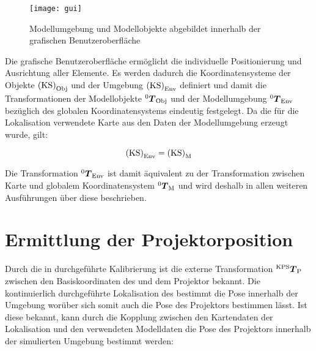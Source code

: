 \begin{figure}[!ht]
	\begin{center}
		\texttt{[image: gui]}
		\caption{Modellumgebung und Modellobjekte abgebildet innerhalb der grafischen Benutzeroberfläche}
		\label{fig.modscene}
	\end{center}
\end{figure}

\prever{
}

Die grafische Benutzeroberfläche ermöglicht die individuelle Positionierung und Ausrichtung aller Elemente. Es werden dadurch die Koordinatensysteme der Objekte ${\mathrm{(KS)}}_{\mathrm{Obj}}$ und der Umgebung ${\mathrm{(KS)}}_{\mathrm{Env}}$ definiert und damit die Transformationen der Modellobjekte ${^{\mathrm{0}}\mbox{\boldmath{$T$}}_{\mathrm{Obj}}}$ und der Modellumgebung ${^{\mathrm{0}}\mbox{\boldmath{$T$}}_{\mathrm{Env}}}$ bezüglich des globalen Koordinatensystems eindeutig festgelegt. Da die für die Lokalisation verwendete Karte aus den Daten der Modellumgebung erzeugt wurde, gilt:

\begin{equation}
{\mathrm{(KS)}}_{\mathrm{Env}} = {\mathrm{(KS)}}_{\mathrm{M}}
\end{equation}


Die Transformation ${^{\mathrm{0}}\mbox{\boldmath{$T$}}_{\mathrm{Env}}}$ ist damit äquivalent zu der Transformation zwischen Karte und globalem Koordinatensystem ${^{\mathrm{0}}\mbox{\boldmath{$T$}}_{\mathrm{M}}}$ und wird deshalb in allen weiteren Ausführungen über diese beschrieben.\\
\prever{
}

\section{Ermittlung der Projektorposition}
Durch die in  durchgeführte Kalibrierung ist die externe Transformation ${^{\mathrm{KPS}}\mbox{\boldmath{$T$}}_{\mathrm{P}}}$ zwischen den Basiskoordinaten des  und dem Projektor bekannt. Die kontinuierlich durchgeführte Lokalisation des  bestimmt die Pose innerhalb der Umgebung worüber sich somit auch die Pose des Projektors bestimmen lässt. Ist diese bekannt, kann durch die Kopplung zwischen den Kartendaten der Lokalisation und den verwendeten Modelldaten die Pose des Projektors innerhalb der simulierten Umgebung bestimmt werden:

